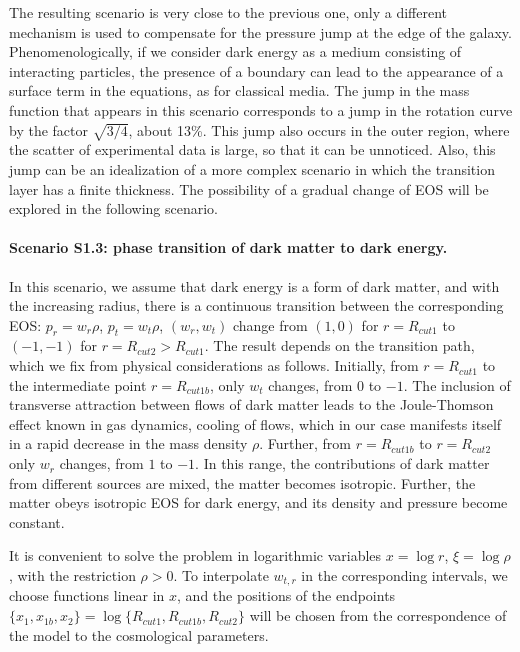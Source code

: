 \documentclass{article}
\begin{document}
The resulting scenario is very close to the previous one, only a different mechanism is used to compensate for the pressure jump at the edge of the galaxy. Phenomenologically, if we consider dark energy as a medium consisting of interacting particles, the presence of a boundary can lead to the appearance of a surface term in the equations, as for classical media. The jump in the mass function that appears in this scenario corresponds to a jump in the rotation curve by the factor $ \sqrt {3/4} $, about 13\%. This jump also occurs in the outer region, where the scatter of experimental data is large, so that it can be unnoticed. Also, this jump can be an idealization of a more complex scenario in which the transition layer has a finite thickness. The possibility of a gradual change of EOS will be explored in the following scenario. 

\paragraph {Scenario S1.3: phase transition of dark matter to dark energy.} In this scenario, we assume that dark energy is a form of dark matter, and with the increasing radius, there is a continuous transition between the corresponding EOS: $ p_r = w_r \rho $, $ p_t = w_t \rho $, $ (w_r, w_t) $ change from $ (1,0) $ for $ r = R_ {cut1} $ to $ (- 1, -1) $ for $ r = R_ {cut2 }> R_ {cut1} $. The result depends on the transition path, which we fix from physical considerations as follows. Initially, from $ r = R_ {cut1} $ to the intermediate point $ r = R_ {cut1b} $, only $ w_t $ changes, from $ 0 $ to $ -1 $. The inclusion of transverse attraction between flows of dark matter leads to the Joule-Thomson effect known in gas dynamics, cooling of flows, which in our case manifests itself in a rapid decrease in the mass density $ \rho $. Further, from $ r = R_ {cut1b} $ to $ r = R_ {cut2} $ only $ w_r $ changes, from $ 1 $ to $ -1 $. In this range, the contributions of dark matter from different sources are mixed, the matter becomes isotropic. Further, the matter obeys isotropic EOS for dark energy, and its density and pressure become constant.

It is convenient to solve the problem in logarithmic variables $ x = \log r $, $ \xi = \log \rho $, with the restriction $ \rho> 0 $. To interpolate $ w_ {t, r} $ in the corresponding intervals, we choose functions linear in $ x $, and the positions of the endpoints $ \{x_1, x_ {1b}, x_2 \} = \log \{R_ {cut1}, R_ {cut1b}, R_ {cut2} \} $ will be chosen from the correspondence of the model to the cosmological parameters.
\end{document}
